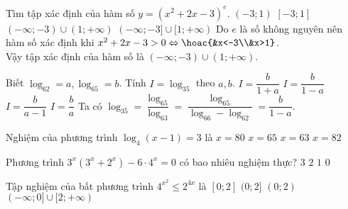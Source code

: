 \begin{ex}%
	Tìm tập xác định của hàm số $y=\left(x^2+2 x-3\right)^e$.
	\choice
	{$(-3 ; 1)$}
	{$[-3 ; 1]$}
	{\True $(-\infty ;-3) \cup(1 ;+\infty)$}
	{$(-\infty ;-3] \cup[1 ;+\infty)$}
	\loigiai
	{Do $e$ là số không nguyên nên hàm số xác định khi $x^{2}+2 x-3>0 \Leftrightarrow \hoac{&x<-3\\&x>1}$.\\
		Vậy tập xác định của hàm số là $(-\infty ;-3) \cup(1 ;+\infty)$.
	}
\end{ex}

\begin{ex}%
	Biết $\log_62=a, \log_65=b$. Tính $I=\log_35$ theo $a, b$.
	\choice
	{$I=\dfrac{b}{1+a}$}
	{\True $I=\dfrac{b}{1-a}$}
	{$I=\dfrac{b}{a-1}$}
	{$I=\dfrac{b}{a}$}
	\loigiai
	{
		Ta có $\log _35=\dfrac{\log_65}{\log_63}=\dfrac{\log_65}{\log_66-\log_62}=\dfrac{b}{1-a}$.
	}
\end{ex}


\begin{ex}%
	Nghiệm của phương trình $\log_4(x-1)=3$ là
	\choice
	{$x=80$}
	{\True $x=65$}
	{$x=63$}
	{$x=82$}
\end{ex}

\begin{ex}%
	Phương trình $3^x(3^x+2^x)-6\cdot 4^x=0$ có bao nhiêu nghiệm thực?
	\choice
	{$3$}
	{$2$}
	{\True $1$}
	{$0$}
\end{ex}

\begin{ex}%
	Tập nghiệm của bất phương trình $4^{x^2}\le 2^{4x}$ là
	\choice
	{\True $[0;2]$}
	{$(0;2]$}
	{$(0;2)$}
	{$(-\infty;0]\cup [2;+\infty)$}
\end{ex}

